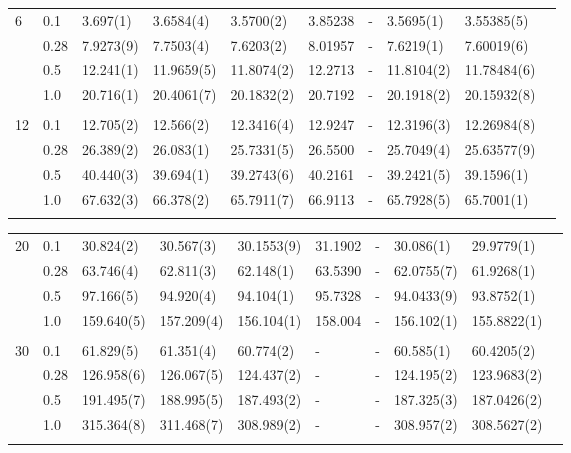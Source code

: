 {\begin{landscape}
\begin{table}
\begin{tabularx}{\hsize}{llR{2.3cm}R{2.3cm}R{2.3cm}R{2.3cm}R{2.3cm}R{2.3cm}R{2.3cm}R{2.2cm}}
		6 & 0.1 & 3.697(1) & 3.6584(4) & 3.5700(2) & 3.85238 & - & 3.5695(1) & 3.55385(5) \\ 
		& 0.28 & 7.9273(9) & 7.7503(4) & 7.6203(2) & 8.01957 & - & 7.6219(1) & 7.60019(6) \\
		& 0.5 & 12.241(1) & 11.9659(5) & 11.8074(2) & 12.2713 & - & 11.8104(2) & 11.78484(6) \\
		& 1.0 & 20.716(1) & 20.4061(7) & 20.1832(2) & 20.7192 & - & 20.1918(2) & 20.15932(8) \\ \hdashline \\
		
		12 & 0.1 & 12.705(2) & 12.566(2) & 12.3416(4) & 12.9247 & - & 12.3196(3) & 12.26984(8) \\ 
		& 0.28 & 26.389(2) & 26.083(1) & 25.7331(5) & 26.5500 & - & 25.7049(4) & 25.63577(9) \\
		& 0.5 & 40.440(3) & 39.694(1) & 39.2743(6) & 40.2161 & - & 39.2421(5) & 39.1596(1) \\
		& 1.0 & 67.632(3) & 66.378(2) & 65.7911(7) & 66.9113 & - & 65.7928(5) & 65.7001(1) \\ \hdashline
	\end{tabularx}
\end{table}

\begin{table}
	\begin{tabularx}{\hsize}{llR{2.3cm}R{2.3cm}R{2.3cm}R{2.3cm}R{2.3cm}R{2.3cm}R{2.3cm}R{2.1cm}} \\
		\label{tab:quantumdotswinteraction2D2}
		20 & 0.1 & 30.824(2) & 30.567(3) & 30.1553(9) & 31.1902 & - & 30.086(1) & 29.9779(1) \\ 
		& 0.28 & 63.746(4) & 62.811(3) & 62.148(1) & 63.5390 & - & 62.0755(7) & 61.9268(1) \\
		& 0.5 & 97.166(5) & 94.920(4) & 94.104(1) & 95.7328 & - & 94.0433(9) & 93.8752(1) \\
		& 1.0 & 159.640(5) & 157.209(4) & 156.104(1) & 158.004 & - & 156.102(1) & 155.8822(1) & \phantom{=} \\ \hdashline \\
		
		30 & 0.1 & 61.829(5) & 61.351(4) & 60.774(2) & - & - & 60.585(1) & 60.4205(2) \\ 
		& 0.28 & 126.958(6) & 126.067(5) & 124.437(2) & - & - & 124.195(2) & 123.9683(2) \\
		& 0.5 & 191.495(7) & 188.995(5) & 187.493(2) & - & - & 187.325(3) & 187.0426(2) \\
		& 1.0 & 315.364(8) & 311.468(7) & 308.989(2) & - & - & 308.957(2) & 308.5627(2) \\ \hdashline \\
		

\end{tabularx}
\end{table}
\end{landscape}}
